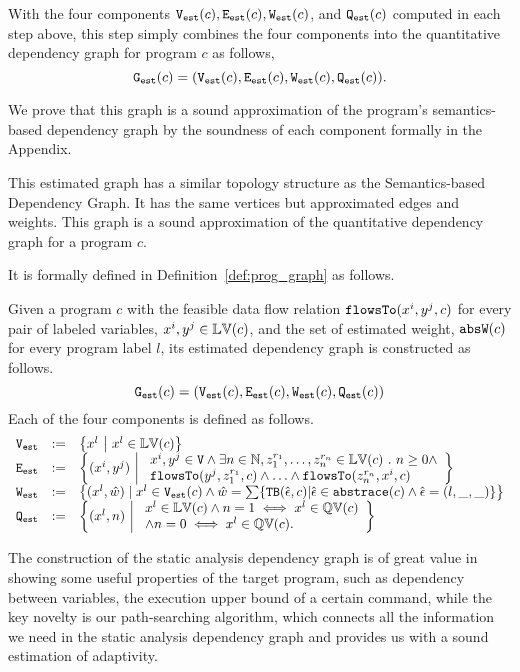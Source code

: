 With the four components $\mathtt{{V_{est}}}(c), \mathtt{{E_{est}}}(c), \mathtt{{W_{est}}}(c)$, and $\mathtt{{Q_{est}}}(c)$
computed in each step above, this step simply combines the four components into the quantitative dependency graph for program $c$ as follows,
 \[
 \mathtt{{G_{est}}}(c) = (\mathtt{{V_{est}}}(c), \mathtt{{E_{est}}}(c), \mathtt{{W_{est}}}(c), \mathtt{{Q_{est}}}(c)).
 \]

 We prove that this graph is a sound approximation of the program's semantics-based dependency graph by the soundness of each component formally in the Appendix.

This estimated graph has a similar topology structure as 
the Semantics-based Dependency Graph. It has the same
vertices 
but approximated edges and weights. 
This graph is a sound approximation of the quantitative dependency graph for a program $c$.

It is formally defined in Definition~\ref{def:prog_graph} as follows.

\begin{defn}
\label{def:prog_graph}
Given a program $c$ 
% 
with the feasible data flow relation $\mathtt{flowsTo}(x^i, y^j, c)$ for every pair of labeled variables, $x^i, y^j \in \mathbb{LV}(c)$, 
and the set of estimated weight, $\mathtt{abs}{\mathtt{W}}(c)$ for every program label $l$,
its estimated dependency graph
is constructed as follows.
\[\mathtt{{G_{est}}}(c) = (\mathtt{{V_{est}}}(c), \mathtt{{E_{est}}}(c), \mathtt{{W_{est}}}(c), \mathtt{{Q_{est}}}(c))\]
Each of the four components is defined as follows.
{\small
\[
\begin{array}{lll}
\progV & := & \left\{ 
x^l
~ \middle\vert ~
x^l \in \lvar(c)
\right\}
\\
\progE & := & 
\left\{ 
(x^i, y^j) 
~ \middle\vert ~
\begin{array}{l}
x^i, y^j \in \vertxs
\land
\exists n \in \mathbb{N}, z_1^{r_1}, \ldots, z_n^{r_n} \in \lvar(c) \st
n \geq 0 \land
\\
\flowsto(y^j, z_1^{r_1}, c) 
\land \ldots \land \flowsto(z_n^{r_n}, x^i, c) 
\end{array}
\right\}
\\
\progW & := &
\left\{ (x^l, \hat{w}) 
\mid
x^l \in \progV(c) \land 
\hat{w} = 
\sum\left\{ \absclr(\absevent, c) \middle\vert \absevent \in \absflow(c) \land \absevent = (l, \_, \_) \right\}
\right\}
\\
\progF & := & 
\left\{(x^l, n) 
~ \middle\vert ~
\begin{array}{l}
 x^l \in \lvar(c) \land
 n = 1 \iff x^l \in \qvar(c) \\
\land n = 0 \iff x^l \in \qvar(c) .
\end{array}
\right\}
\end{array}
\] }
\end{defn}
The construction of the static analysis dependency graph is of great value in showing some useful properties of the target program,
such as dependency between variables, the execution upper bound of a certain command,
while the key novelty is our path-searching algorithm, which connects all the information we need in the static analysis dependency graph and provides us with a sound estimation of adaptivity.

